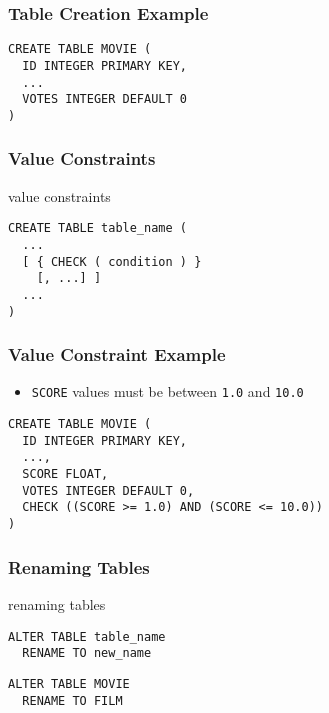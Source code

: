 \documentclass[dvipsnames]{beamer}
\theoremstyle{plain}
\begin{document}
\begin{frame}[fragile]
  \frametitle{Table Creation Example}

  \begin{example}
    \begin{lstlisting}
CREATE TABLE MOVIE (
  ID INTEGER PRIMARY KEY,
  ...
  VOTES INTEGER DEFAULT 0
)
    \end{lstlisting}
  \end{example}
\end{frame}

\begin{frame}[fragile]
  \frametitle{Value Constraints}

  \begin{block}{value constraints}
    \begin{lstlisting}
CREATE TABLE table_name (
  ...
  [ { CHECK ( condition ) }
    [, ...] ]
  ...
)
    \end{lstlisting}
  \end{block}
\end{frame}

\begin{frame}[fragile]
  \frametitle{Value Constraint Example}

  \begin{example}
    \begin{itemize}
      \item \texttt{SCORE} values must be between \texttt{1.0} and \texttt{10.0}
    \end{itemize}

    \begin{lstlisting}
CREATE TABLE MOVIE (
  ID INTEGER PRIMARY KEY,
  ...,
  SCORE FLOAT,
  VOTES INTEGER DEFAULT 0,
  CHECK ((SCORE >= 1.0) AND (SCORE <= 10.0))
)
    \end{lstlisting}
  \end{example}
\end{frame}

\begin{frame}[fragile]
  \frametitle{Renaming Tables}

  \begin{block}{renaming tables}
    \begin{lstlisting}
ALTER TABLE table_name
  RENAME TO new_name
    \end{lstlisting}
  \end{block}

  \pause
  \medskip
  \begin{example}
    \begin{lstlisting}
ALTER TABLE MOVIE
  RENAME TO FILM
    \end{lstlisting}
  \end{example}
\end{frame}
\end{document}

